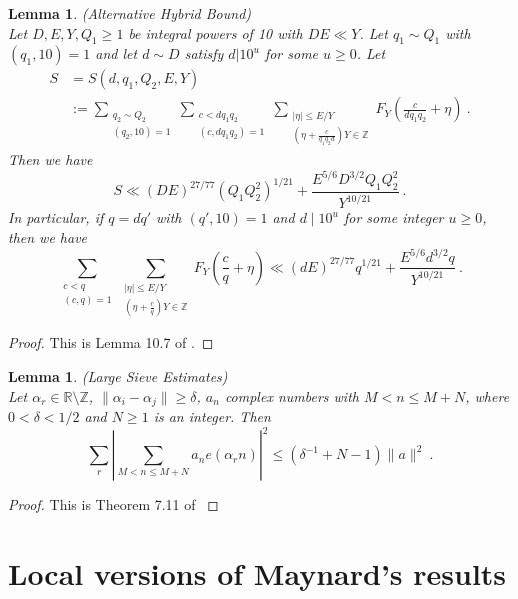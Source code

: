 \documentclass{amsart}
\newtheorem{lemma}[theorem]{Lemma}
\numberwithin{equation}{subsection}
\begin{document}
\begin{lemma}\label{lem56} (Alternative Hybrid Bound)\\
Let $D, E, Y, Q_1\geq 1$ be integral powers of 10 with $DE\ll Y$. Let $q_1\sim Q_1$ with $(q_1, 10)=1$ and let $d\sim D$ satisfy $d|10^u$ for some $u\geq 0$. Let
\begin{align*}
S&=S(d, q_1, Q_2, E, Y)\\
&:=\sum_{\substack{q_2\sim Q_2 \\ (q_2, 10)=1}}\sum_{\substack{c<dq_1q_2 \\ (c, dq_1q_2)=1}}\sum_{\substack{|\eta|\leq E/Y \\ \left(\eta+\frac{c}{q_1q_2d}\right)Y\in\mathbb{Z}}}
 F_Y\left(\frac{c}{dq_1q_2} +\eta\right)\:.
\end{align*}
Then we have 
$$S\ll (DE)^{27/77}(Q_1Q_2^2)^{1/21}+\frac{E^{5/6}D^{3/2}Q_1Q_2^2}{Y^{10/21}}\:.$$
In particular, if $q=dq'$ with $(q',10)=1$ and $d\mid 10^u$ for some integer $u\geq 0$, then we have
$$\sum_{\substack{c<q \\ (c, q)=1}}\sum_{\substack{|\eta|\leq E/Y \\ \left(\eta+\frac{c}{q}\right)Y\in\mathbb{Z}}}
 F_Y\left(\frac{c}{q} +\eta\right)\ll (dE)^{27/77} q^{1/21}+\frac{E^{5/6}d^{3/2}q}{Y^{10/21}}\:.$$
\end{lemma}

\begin{proof}
This is Lemma 10.7 of \cite{maynard}.
\end{proof}

\begin{lemma}\label{lem57}(Large Sieve Estimates)\\
Let $\alpha_r \in\mathbb{R}\setminus\mathbb{Z}$, $\|\alpha_i-\alpha_j\|\geq \delta$, $a_n$ complex numbers with $M<n\leq M+N$, where $0<\delta<1/2$ and $N\geq 1$ is an integer. Then 
$$\sum_r\left| \sum_{M<n\leq M+N} a_n e(\alpha_r n) \right|^2 \leq (\delta^{-1}+N-1)\|a\|^2  \:.$$
\end{lemma}
\begin{proof}
This is Theorem 7.11 of \cite{IKW}
\end{proof}




\section{Local versions of Maynard's results}
\end{document}
